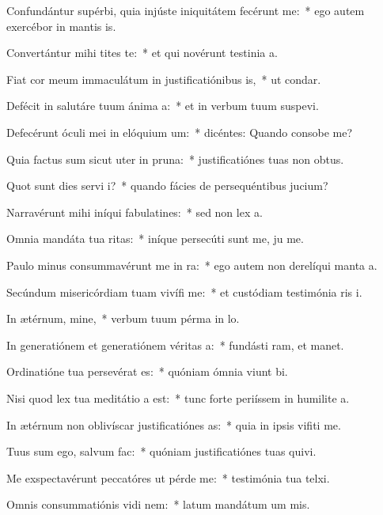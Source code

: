 \item Confundántur supérbi, quia injúste iniquitátem fecérunt  me:~* ego autem exercébor in mantis is.
\item Convertántur mihi tites te:~* et qui novérunt testinia a.
\item Fiat cor meum immaculátum in justificatiónibus is,~* ut  condar.
\item Defécit in salutáre tuum ánima a:~* et in verbum tuum suspevi.
\item Defecérunt óculi mei in elóquium um:~* dicéntes: Quando consobe me?
\item Quia factus sum sicut uter in pruna:~* justificatiónes tuas non  obtus.
\item Quot sunt dies servi i?~* quando fácies de persequéntibus  jucium?
\item Narravérunt mihi iníqui fabulatines:~* sed non  lex a.
\item Omnia mandáta tua ritas:~* iníque persecúti sunt me, ju me.
\item Paulo minus consummavérunt me in ra:~* ego autem non derelíqui manta a.
\item Secúndum misericórdiam tuam vivífi me:~* et custódiam testimónia ris i.
\item In ætérnum, mine,~* verbum tuum pérma in lo.
\item In generatiónem et generatiónem véritas a:~* fundásti ram, et manet.
\item Ordinatióne tua persevérat es:~* quóniam ómnia viunt bi.
\item Nisi quod lex tua meditátio a est:~* tunc forte periíssem in humilite a.
\item In ætérnum non oblivíscar justificatiónes as:~* quia in ipsis vifiti me.
\item Tuus sum ego, salvum  fac:~* quóniam justificatiónes tuas quivi.
\item Me exspectavérunt peccatóres ut pérde me:~* testimónia tua telxi.
\item Omnis consummatiónis vidi nem:~* latum mandátum um mis.
